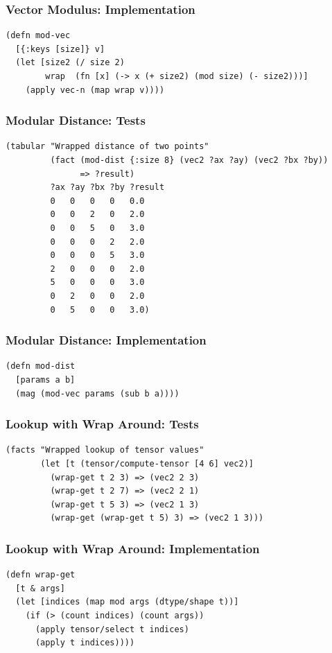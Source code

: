 \documentclass[aspectratio=169,11pt,xcolor=dvipsnames]{beamer}
\begin{document}
\begin{frame}[fragile]
  \frametitle{Vector Modulus: Implementation}
  \begin{verbatim}
(defn mod-vec
  [{:keys [size]} v]
  (let [size2 (/ size 2)
        wrap  (fn [x] (-> x (+ size2) (mod size) (- size2)))]
    (apply vec-n (map wrap v))))
  \end{verbatim}
\end{frame}

\begin{frame}[fragile]
  \frametitle{Modular Distance: Tests}
  \begin{verbatim}
(tabular "Wrapped distance of two points"
         (fact (mod-dist {:size 8} (vec2 ?ax ?ay) (vec2 ?bx ?by))
               => ?result)
         ?ax ?ay ?bx ?by ?result
         0   0   0   0   0.0
         0   0   2   0   2.0
         0   0   5   0   3.0
         0   0   0   2   2.0
         0   0   0   5   3.0
         2   0   0   0   2.0
         5   0   0   0   3.0
         0   2   0   0   2.0
         0   5   0   0   3.0)
  \end{verbatim}
\end{frame}

\begin{frame}[fragile]
  \frametitle{Modular Distance: Implementation}
  \begin{verbatim}
(defn mod-dist
  [params a b]
  (mag (mod-vec params (sub b a))))
  \end{verbatim}
\end{frame}

\begin{frame}[fragile]
  \frametitle{Lookup with Wrap Around: Tests}
  \begin{verbatim}
(facts "Wrapped lookup of tensor values"
       (let [t (tensor/compute-tensor [4 6] vec2)]
         (wrap-get t 2 3) => (vec2 2 3)
         (wrap-get t 2 7) => (vec2 2 1)
         (wrap-get t 5 3) => (vec2 1 3)
         (wrap-get (wrap-get t 5) 3) => (vec2 1 3)))
  \end{verbatim}
\end{frame}

\begin{frame}[fragile]
  \frametitle{Lookup with Wrap Around: Implementation}
  \begin{verbatim}
(defn wrap-get
  [t & args]
  (let [indices (map mod args (dtype/shape t))]
    (if (> (count indices) (count args))
      (apply tensor/select t indices)
      (apply t indices))))
  \end{verbatim}
\end{frame}
\end{document}
